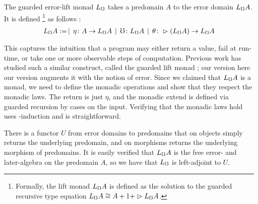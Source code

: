 The guarded error-lift monad $L_\mho$ takes a predomain $A$ to the error domain $L_\mho A$.
It is defined \footnote{Formally, the lift monad $L_\mho A$ is defined as the solution to
the guarded recursive type equation $L_\mho A \cong A + 1 + \vartriangleright L_\mho A$.} as follows :
%
\begin{align*}
  L_\mho A :=
  \mathrel{\bf \,\mid\,} \eta \colon A \to L_\mho A
  \mathrel{\bf \,\mid\,} \mho \colon L_\mho A
  \mathrel{\bf \,\mid\,} \theta \colon \vartriangleright (L_\mho A) \to L_\mho A
\end{align*}
%

This captures the intuition that a program may either return a value,
fail at run-time, or take one or more observable steps of computation.
Previous work has studied such a similar construct, called the guarded lift
monad \cite{mogelberg-paviotti2016}; our version here our version augments it with the notion of error.
Since we claimed that $L_\mho A$ is a monad, we need to define the monadic operations
and show that they respect the monadic laws. The return is just $\eta$, and the monadic extend
is defined via guarded recursion by cases on the input.
Verifying that the monadic laws hold uses \lob-induction and is straightforward.


There is a functor $U$ from error domains to predomains that on objects simply returns the
underlying predomain, and on morphisms returns the underlying morphism of predomains.
It is easily verified that $L_\mho A$ is the free error- and later-algebra on the predomain $A$,
so we have that $L_\mho$ is left-adjoint to $U$.



